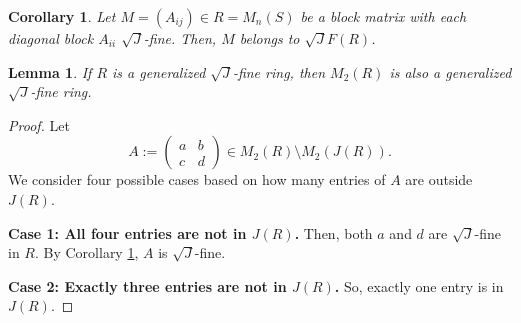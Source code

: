 \documentclass[10pt,a4paper]{amsart}
\newtheorem{corollary}{Corollary}
\newtheorem{lemma}{Lemma}
\begin{document}
\begin{corollary}\label{Block}
Let \( M = (A_{ij}) \in R = M_n(S) \) be a block matrix with each diagonal block \( A_{ii} \) \(\sqrt{J}\)-fine. Then, \( M \) belongs to \(\sqrt{J}F(R)\).
\end{corollary}

\begin{lemma}\label{2.4}
If \( R \) is a generalized $\sqrt{J}$-fine ring, then \( M_2(R) \) is also a generalized $\sqrt{J}$-fine ring.
\end{lemma}

\begin{proof}
Let
	\[
	A := \begin{pmatrix} a & b \\ c & d \end{pmatrix} \in M_2(R) \setminus M_2(J(R)).
	\]
We consider four possible cases based on how many entries of \( A \) are outside \( J(R) \).

\medskip
	
\textbf{Case 1: All four entries are not in \( J(R) \).} Then, both \( a \) and \( d \) are $\sqrt{J}$-fine in \( R \). By Corollary \ref{Block}, \( A \) is $\sqrt{J}$-fine.

\medskip
	
\textbf{Case 2: Exactly three entries are not in \( J(R) \).} So, exactly one entry is in \( J(R) \).

\medskip
	

\end{proof}
\end{document}
